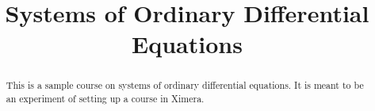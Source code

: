 \documentclass[12pt]{xourse}
\title{Systems of Ordinary Differential Equations}
\begin{document}
\begin{abstract}
This is a sample course on systems of ordinary differential equations. It is meant to be an experiment of setting up a course in Ximera.
\end{abstract} 

\maketitle

\end{document}
